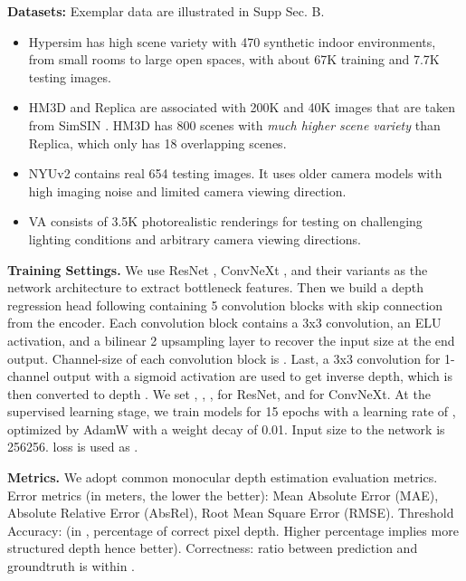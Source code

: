 \textbf{Datasets:} Exemplar data are illustrated in Supp Sec. B.
\begin{itemize}[leftmargin=*,topsep=-3pt,itemsep=-0.8ex]
  \item Hypersim \cite{roberts2020hypersim} has high scene variety with 470 synthetic indoor environments, from small rooms to large open spaces, with about 67K training and 7.7K testing images.
  \item HM3D \cite{ramakrishnan2021habitat} and Replica \cite{straub2019replica} are associated with 200K and 40K images that are taken from SimSIN \cite{wu2022toward}. HM3D has 800 scenes with \textit{much higher scene variety} than Replica, which only has 18 overlapping scenes. 
\item NYUv2 \cite{silberman2012indoor} contains real 654 testing images. It uses older camera models with high imaging noise and limited camera viewing direction.
  \item VA \cite{wu2022toward} consists of 3.5K photorealistic renderings for testing on challenging lighting conditions and arbitrary camera viewing directions.
\end{itemize}
\vspace{4pt}

\textbf{Training Settings.} We use ResNet \cite{he2016deep}, ConvNeXt \cite{liu2022convnet}, and their variants as the network architecture to extract bottleneck features. Then we build a depth regression head following \cite{Godard_2019_ICCV} containing 5 convolution blocks with skip connection from the encoder. Each convolution block contains a 3x3 convolution, an ELU activation, and a bilinear 2 upsampling layer to recover the input size at the end output. Channel-size of each convolution block is . Last, a 3x3 convolution for 1-channel output with a sigmoid activation are used to get inverse depth, which is then converted to depth \cite{Dijk_2019_ICCV}. We set , , ,  for ResNet, and  for ConvNeXt. At the supervised learning stage, we train models for 15 epochs with a learning rate of , optimized by AdamW \cite{loshchilov2018decoupled} with a weight decay of 0.01. Input size to the network is 256256.   loss is used as . 





\textbf{Metrics.} We adopt common monocular depth estimation evaluation metrics. Error metrics (in meters, the lower the better): Mean Absolute Error (MAE), Absolute Relative Error (AbsRel), Root Mean Square Error (RMSE). Threshold Accuracy:  (in , percentage of correct pixel depth. Higher percentage implies more structured depth hence better). Correctness: ratio between prediction and groundtruth is within .

